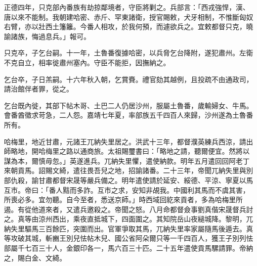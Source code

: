 \begin{pinyinscope}
正德四年，只克部內番族有劫掠鄰境者，守臣將剿之。兵部言：「西戎強悍，漢、唐以來不能制。我朝建哈密、赤斤、罕東諸衛，授官賜敕，犬牙相制，不惟斷匈奴右臂，亦以壯西土籓籬。今番人相攻，於我何預，而遽欲兵之。宜敕都督只克，曉諭諸族，悔過息兵。」報可。

只克卒，子乞台嗣。十一年，土魯番復據哈密，以兵脅乞台降附，遂犯肅州。左衛不克自立，相率徙肅州塞內。守臣不能拒，因撫納之。

乞台卒，子日羔嗣。十六年秋入朝，乞賞賚。禮官劾其越例，且投疏不由通政司，請治館伴者罪，從之。

乞台既內徙，其部下帖木哥、土巴二人仍居沙州，服屬土魯番，歲輸婦女、牛馬。會番酋徵求苛急，二人怨。嘉靖七年夏，率部族五千四百人來歸，沙州遂為土魯番所有。

哈梅里，地近甘肅，元諸王兀納失里居之。洪武十三年，都督濮英練兵西涼，請出師略地，開哈梅里之路以通商旅。太祖賜璽書曰：「略地之請，聽爾便宜。然將以謀為本，爾慎毋忽。」英遂進兵。兀納失里懼，遣使納款。明年五月遣回回阿老丁來朝貢馬。詔賜文綺，遣往畏吾兒之地，招諭諸番。二十三年，帝聞兀納失里與別部仇殺，諭甘肅都督宋晟等嚴兵備之。明年遣使請於延安、綏德、平涼、寧夏以馬互市。帝曰：「番人黠而多詐。互市之求，安知非覘我。中國利其馬而不虞其害，所喪必多。宜勿聽。自今至者，悉送京師。」時西域回紇來貢者，多為哈梅里所遏。有從他道來者，又遣兵邀殺之。帝聞之怒。八月命都督僉事劉真偕宋晟督兵討之。真等由涼州西出，乘夜直抵城下，四面圍之。其知院岳山夜縋城降。黎明，兀納失里驅馬三百餘匹，突圍而出。官軍爭取其馬，兀納失里率家屬隨馬後遁去。真等攻破其城，斬豳王別兒怯帖木兒、國公省阿朵爾只等一千四百人，獲王子別列怯部屬千七百三十人，金銀印各一，馬六百三十匹。二十五年遣使貢馬騾請罪。帝納之，賜白金、文綺。


\end{pinyinscope}